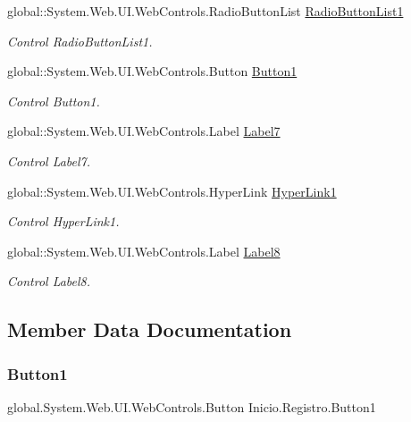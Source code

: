 \begin{DoxyCompactItemize}
global\+::\+System.\+Web.\+U\+I.\+Web\+Controls.\+Radio\+Button\+List \mbox{\hyperlink{class_inicio_1_1_registro_a6a93f0b66e0c307a8f53722f3f41ce91}{Radio\+Button\+List1}}
\begin{DoxyCompactList}\small\item\em Control Radio\+Button\+List1. \end{DoxyCompactList}\item 
global\+::\+System.\+Web.\+U\+I.\+Web\+Controls.\+Button \mbox{\hyperlink{class_inicio_1_1_registro_aa0ba82a780d379b638a877027de7a61b}{Button1}}
\begin{DoxyCompactList}\small\item\em Control Button1. \end{DoxyCompactList}\item 
global\+::\+System.\+Web.\+U\+I.\+Web\+Controls.\+Label \mbox{\hyperlink{class_inicio_1_1_registro_a1f3fd3c1774cb311690a4246ba5aca66}{Label7}}
\begin{DoxyCompactList}\small\item\em Control Label7. \end{DoxyCompactList}\item 
global\+::\+System.\+Web.\+U\+I.\+Web\+Controls.\+Hyper\+Link \mbox{\hyperlink{class_inicio_1_1_registro_aa4f71bea88748ad5dfc036a400cb4537}{Hyper\+Link1}}
\begin{DoxyCompactList}\small\item\em Control Hyper\+Link1. \end{DoxyCompactList}\item 
global\+::\+System.\+Web.\+U\+I.\+Web\+Controls.\+Label \mbox{\hyperlink{class_inicio_1_1_registro_a8f64d7bc53c3f17751f32a57cef78ddb}{Label8}}
\begin{DoxyCompactList}\small\item\em Control Label8. \end{DoxyCompactList}\end{DoxyCompactItemize}


\subsection{Member Data Documentation}
\mbox{\label{class_inicio_1_1_registro_aa0ba82a780d379b638a877027de7a61b}} 
\subsubsection{\texorpdfstring{Button1}{Button1}}
{\footnotesize\ttfamily global.\+System.\+Web.\+U\+I.\+Web\+Controls.\+Button Inicio.\+Registro.\+Button1\hspace{0.3cm}{\ttfamily [protected]}}



